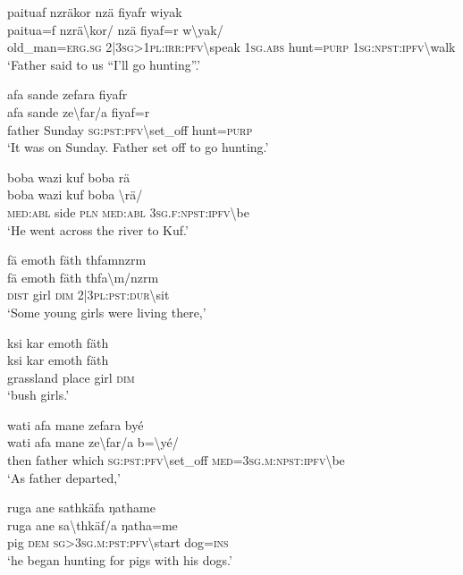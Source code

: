 \ea\label{ex:12:a727}
paituaf nzräkor nzä fiyafr wiyak\\
\gll paitua=f	nzrä{\textbackslash}kor/	nzä	fiyaf=r	w{\textbackslash}yak/\\
     old\_man=\textsc{erg}.\textsc{sg}	2|3\textsc{sg}>1\textsc{pl}:\textsc{irr}:\textsc{pfv}{\textbackslash}speak	1\textsc{sg}.\textsc{abs}	hunt=\textsc{purp}	1\textsc{sg}:\textsc{npst}:\textsc{ipfv}{\textbackslash}walk\\
\glt `Father said to us ``I'll go hunting''.'
\z

\ea\label{ex:12:a729}
afa sande zefara fiyafr\\
\gll afa	sande	ze{\textbackslash}far/a	fiyaf=r\\
     father	Sunday	\textsc{sg}:\textsc{pst}:\textsc{pfv}{\textbackslash}set\_off	hunt=\textsc{purp}\\
\glt `It was on Sunday. Father set off to go hunting.'
\z

\ea\label{ex:12:a732}
boba wazi kuf boba rä\\
\gll boba	wazi	kuf	boba	{\textbackslash}rä/\\
     \textsc{med}:\textsc{abl}	side	\textsc{pln}	\textsc{med}:\textsc{abl}	3\textsc{sg}.\textsc{f}:\textsc{npst}:\textsc{ipfv}{\textbackslash}be\\
\glt `He went across the river to Kuf.'
\z

\ea\label{ex:12:a734}
fä emoth fäth thfamnzrm\\
\gll fä	emoth	fäth	thfa{\textbackslash}m/nzrm\\
     \textsc{dist}	girl	\textsc{dim}	2|3\textsc{pl}:\textsc{pst}:\textsc{dur}{\textbackslash}sit\\
\glt `Some young girls were living there,'
\z

\ea\label{ex:12:a735}
ksi kar emoth fäth\\
\gll ksi	kar	emoth	fäth\\
     grassland	place	girl	\textsc{dim}\\
\glt `bush girls.'
\z

\ea\label{ex:12:a736}
wati afa mane zefara byé\\
\gll wati	afa	mane	ze{\textbackslash}far/a	b={\textbackslash}yé/\\
     then	father	which	\textsc{sg}:\textsc{pst}:\textsc{pfv}{\textbackslash}set\_off	\textsc{med}=3\textsc{sg}.\textsc{m}:\textsc{npst}:\textsc{ipfv}{\textbackslash}be\\
\glt `As father departed,'
\z

\ea\label{ex:12:a737}
ruga ane sathkäfa ŋathame\\
\gll ruga	ane	sa{\textbackslash}thkäf/a	ŋatha=me\\
     pig	\textsc{dem}	\textsc{sg}>3\textsc{sg}.\textsc{m}:\textsc{pst}:\textsc{pfv}{\textbackslash}start	dog=\textsc{ins}\\
\glt `he began hunting for pigs with his dogs.'
\z

